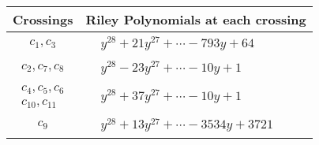 \documentclass[1p]{elsarticle_modified}
\theoremstyle{definition}
\begin{document}
\begin{tabular}{m{50pt}|m{274pt}}
Crossings & \hspace{64pt}Riley Polynomials at each crossing \\
\hline $$\begin{aligned}c_{1},c_{3}\end{aligned}$$&$\begin{aligned}
&y^{28}+21 y^{27}+\cdots-793 y+64
\end{aligned}$\\
\hline $$\begin{aligned}c_{2},c_{7},c_{8}\end{aligned}$$&$\begin{aligned}
&y^{28}-23 y^{27}+\cdots-10 y+1
\end{aligned}$\\
\hline $$\begin{aligned}c_{4},c_{5},c_{6}\\c_{10},c_{11}\end{aligned}$$&$\begin{aligned}
&y^{28}+37 y^{27}+\cdots-10 y+1
\end{aligned}$\\
\hline $$\begin{aligned}c_{9}\end{aligned}$$&$\begin{aligned}
&y^{28}+13 y^{27}+\cdots-3534 y+3721
\end{aligned}$\\
\hline
\end{tabular}
\vskip 2pc
\end{document}
